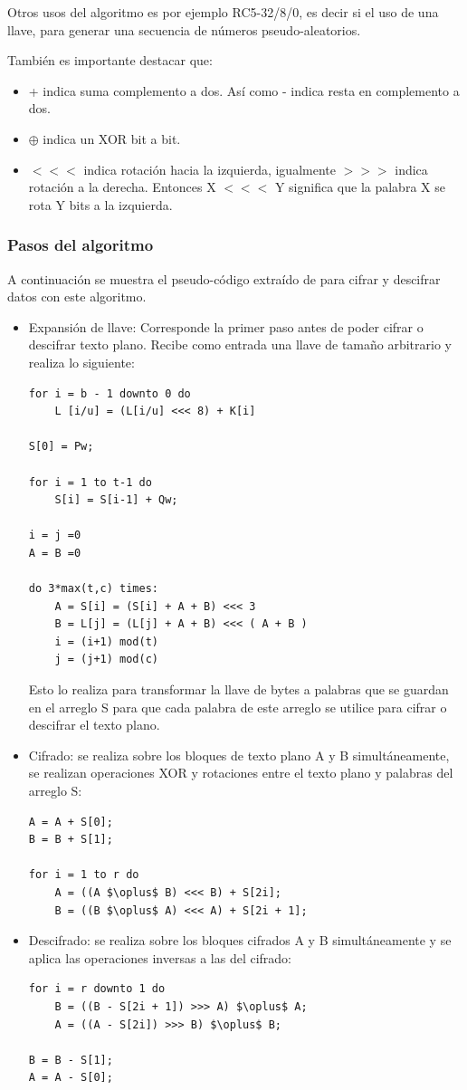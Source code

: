 Otros usos del algoritmo es por ejemplo \citep{rivest} RC5-32/8/0, es decir si el uso de una llave, para generar una secuencia de números pseudo-aleatorios.


También es importante destacar que:
\begin{itemize}
\item + indica suma complemento a dos. Así como - indica resta en complemento a dos.
\item $\oplus$ indica un XOR bit a bit.
\item $<<<$ indica rotación hacia la izquierda, igualmente $>>>$ indica rotación a la derecha. Entonces X $<<<$ Y significa que la palabra X se rota Y bits a la izquierda.
\end{itemize}

\subsubsection{Pasos del algoritmo}
A continuación se muestra el pseudo-código extraído de \cite{rivest} para cifrar y descifrar datos con este algoritmo. 
\begin{itemize}
\item Expansión de llave: Corresponde la primer paso antes de poder cifrar o descifrar texto plano. Recibe como entrada una llave de tamaño arbitrario y realiza lo siguiente:
\begin{lstlisting}[mathescape]
for i = b - 1 downto 0 do
	L [i/u] = (L[i/u] <<< 8) + K[i]
	
S[0] = Pw;

for i = 1 to t-1 do
	S[i] = S[i-1] + Qw;
	
i = j =0
A = B =0

do 3*max(t,c) times:
	A = S[i] = (S[i] + A + B) <<< 3
	B = L[j] = (L[j] + A + B) <<< ( A + B )
	i = (i+1) mod(t)
	j = (j+1) mod(c)
\end{lstlisting}
Esto lo realiza para transformar la llave de bytes a palabras que se guardan en el arreglo S para que cada palabra de este arreglo se utilice para cifrar o descifrar el texto plano.

\item Cifrado: se realiza sobre los bloques de texto plano A y B simultáneamente, se realizan operaciones XOR y rotaciones entre el texto plano y palabras del arreglo S:
\begin{lstlisting}[mathescape]
A = A + S[0];
B = B + S[1];

for i = 1 to r do
	A = ((A $\oplus$ B) <<< B) + S[2i];
	B = ((B $\oplus$ A) <<< A) + S[2i + 1];
\end{lstlisting}


\item Descifrado: se realiza sobre los bloques cifrados A y B simultáneamente y se aplica las operaciones inversas a las del cifrado:
\begin{lstlisting}[mathescape]
for i = r downto 1 do
	B = ((B - S[2i + 1]) >>> A) $\oplus$ A;
	A = ((A - S[2i]) >>> B) $\oplus$ B;
	
B = B - S[1];
A = A - S[0];
\end{lstlisting}
\end{itemize}





